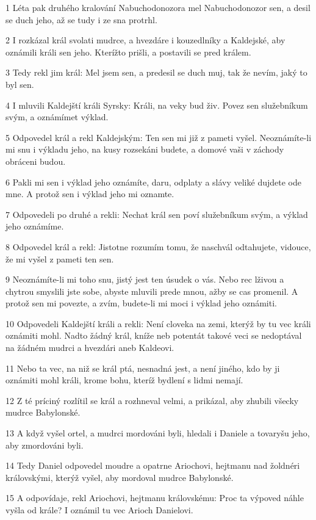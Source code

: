 \par 1 Léta pak druhého kralování Nabuchodonozora mel Nabuchodonozor sen, a desil se duch jeho, až se tudy i ze sna protrhl.
\par 2 I rozkázal král svolati mudrce, a hvezdáre i kouzedlníky a Kaldejské, aby oznámili králi sen jeho. Kterížto prišli, a postavili se pred králem.
\par 3 Tedy rekl jim král: Mel jsem sen, a predesil se duch muj, tak že nevím, jaký to byl sen.
\par 4 I mluvili Kaldejští králi Syrsky: Králi, na veky bud živ. Povez sen služebníkum svým, a oznámímet výklad.
\par 5 Odpovedel král a rekl Kaldejským: Ten sen mi již z pameti vyšel. Neoznámíte-li mi snu i výkladu jeho, na kusy rozsekáni budete, a domové vaši v záchody obráceni budou.
\par 6 Pakli mi sen i výklad jeho oznámíte, daru, odplaty a slávy veliké dujdete ode mne. A protož sen i výklad jeho mi oznamte.
\par 7 Odpovedeli po druhé a rekli: Nechat král sen poví služebníkum svým, a výklad jeho oznámíme.
\par 8 Odpovedel král a rekl: Jistotne rozumím tomu, že naschvál odtahujete, vidouce, že mi vyšel z pameti ten sen.
\par 9 Neoznámíte-li mi toho snu, jistý jest ten úsudek o vás. Nebo rec lživou a chytrou smyslili jste sobe, abyste mluvili prede mnou, ažby se cas promenil. A protož sen mi povezte, a zvím, budete-li mi moci i výklad jeho oznámiti.
\par 10 Odpovedeli Kaldejští králi a rekli: Není cloveka na zemi, kterýž by tu vec králi oznámiti mohl. Nadto žádný král, kníže neb potentát takové veci se nedoptával na žádném mudrci a hvezdári aneb Kaldeovi.
\par 11 Nebo ta vec, na niž se král ptá, nesnadná jest, a není jiného, kdo by ji oznámiti mohl králi, krome bohu, kteríž bydlení s lidmi nemají.
\par 12 Z té príciný rozlítil se král a rozhneval velmi, a prikázal, aby zhubili všecky mudrce Babylonské.
\par 13 A když vyšel ortel, a mudrci mordováni byli, hledali i Daniele a tovaryšu jeho, aby zmordováni byli.
\par 14 Tedy Daniel odpovedel moudre a opatrne Ariochovi, hejtmanu nad žoldnéri královskými, kterýž vyšel, aby mordoval mudrce Babylonské.
\par 15 A odpovídaje, rekl Ariochovi, hejtmanu královskému: Proc ta výpoved náhle vyšla od krále? I oznámil tu vec Arioch Danielovi.
